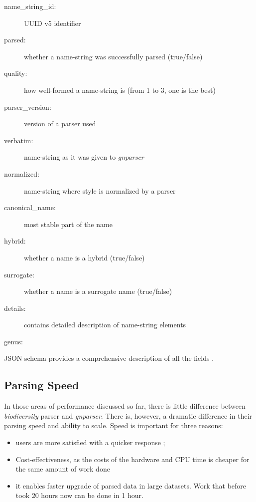 \documentclass{bmcart}
\begin{document}
\begin{description}

  \item[name\_string\_id:] UUID v5 identifier
  \item[parsed:] whether a name-string was successfully parsed (true/false)
  \item[quality:] how well-formed a name-string is (from 1 to 3, one is the
    best)
  \item[parser\_version:] version of a parser used
  \item[verbatim:] name-string as it was given to \textit{gnparser}
  \item[normalized:] name-string where style is normalized by a parser
  \item[canonical\_name:] most stable part of the name
  \item[hybrid:] whether a name is a hybrid (true/false)
  \item[surrogate:] whether a name is a surrogate name (true/false)
  \item[details:] contains detailed description of name-string elements
  \item[genus:]

\end{description}

JSON schema provides a comprehensive description of all the fields
\cite{gnparser-json}.

\subsection*{Parsing Speed}

In those areas of performance discussed so far, there is little difference
between \textit{biodiversity} parser and \textit{gnparser}. There is, however,
a dramatic difference in their parsing speed and ability to scale. Speed is
important for three reasons:


\begin{itemize}

  \item users are more satisfied with a quicker response ;

  \item Cost-effectiveness, as the costs of the hardware and CPU time is
    cheaper for the same amount of work done

  \item it enables faster upgrade of parsed data in large datasets. Work that
    before took 20 hours now can be done in 1 hour.

\end{itemize}
\end{document}
